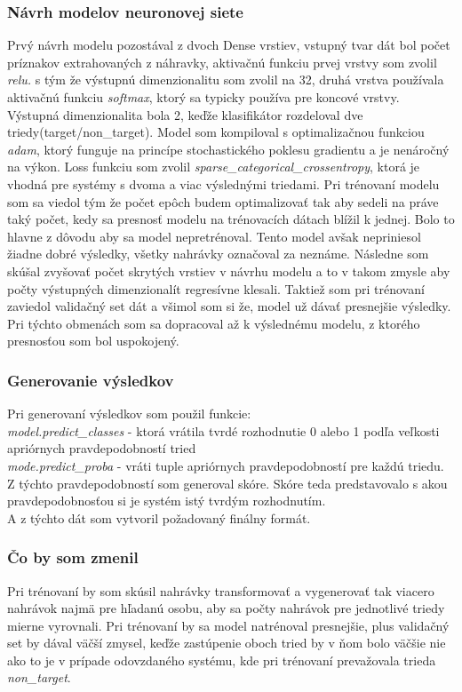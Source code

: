 \documentclass{article}
\begin{document}
    \subsubsection{Návrh modelov neuronovej siete}
    \Large{Prvý návrh modelu pozostával z dvoch Dense vrstiev, vstupný tvar dát bol počet príznakov extrahovaných z náhravky, aktivačnú funkciu prvej vrstvy som zvolil \textit{relu.} s tým že výstupnú dimenzionalitu som zvolil na 32, druhá vrstva používala aktivačnú funkciu \textit{softmax}, ktorý sa typicky používa pre koncové vrstvy. Výstupná dimenzionalita bola 2, keďže klasifikátor rozdeloval dve triedy(target/non\_target). Model som kompiloval s optimalizačnou funkciou \textit{adam}, ktorý funguje na princípe stochastického poklesu gradientu a je nenáročný na výkon. Loss funkciu som zvolil \textit{sparse\_categorical\_crossentropy}, ktorá je vhodná pre systémy s dvoma a viac výslednými triedami. Pri trénovaní modelu som sa viedol tým že počet epôch budem optimalizovať tak aby sedeli na práve taký počet, kedy sa presnosť modelu na trénovacích dátach blížil k jednej. Bolo to hlavne z dôvodu aby sa model nepretrénoval. Tento model avšak nepriniesol žiadne dobré výsledky, všetky nahrávky označoval za neznáme. Následne som skúšal zvyšovať počet skrytých vrstiev v návrhu modelu a to v takom zmysle aby počty výstupných dimenzionalít regresívne klesali. Taktiež som pri trénovaní zaviedol validačný set dát a všimol som si že, model už dávať presnejšie výsledky.  Pri týchto obmenách som sa dopracoval až k výslednému modelu, z ktorého presnosťou som bol uspokojený. }
    \subsubsection{Generovanie výsledkov}
    \Large{Pri generovaní výsledkov som použil funkcie:\\
    \textit{model.predict\_classes} - ktorá vrátila tvrdé rozhodnutie 0 alebo 1 podľa veľkosti apriórnych pravdepodobností tried\\
    \textit{mode.predict\_proba} - vráti tuple apriórnych pravdepodobností pre každú triedu. Z týchto pravdepodobností som generoval skóre. Skóre teda predstavovalo s akou pravdepodobnosťou si je systém istý tvrdým rozhodnutím. \\
    A z týchto dát som vytvoril požadovaný finálny formát. }
    \subsubsection{Čo by som zmenil}
    \Large{Pri trénovaní by som skúsil nahrávky transformovať a vygenerovať tak viacero nahrávok najmä pre hľadanú osobu, aby sa počty nahrávok pre jednotlivé triedy mierne vyrovnali. Pri trénovaní by sa model natrénoval presnejšie, plus validačný set by dával väčší zmysel, keďže zastúpenie oboch tried by v ňom bolo väčšie nie ako to je v prípade odovzdaného systému, kde pri trénovaní prevažovala trieda \textit{non\_target}. }
 
\end{document}
